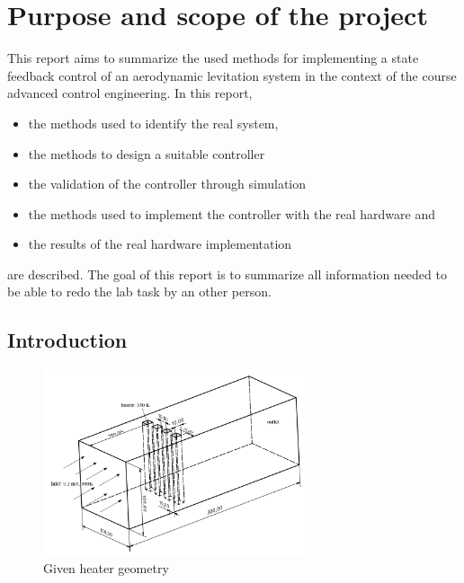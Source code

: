 \chapter{Purpose and scope of the project}
\label{chapter:purpose_and_scope}
This report aims to summarize the used methods for implementing a state feedback control of an aerodynamic levitation system in the context of the course advanced control engineering. In this report, 
\begin{itemize}
    \item the methods used to identify the real system,
    \item the methods to design a suitable controller
    \item the validation of the controller through simulation 
    \item the methods used to implement the controller with the real hardware and
    \item the results of the real hardware implementation
\end{itemize}
    are described. The goal of this report is to summarize all information needed to be able to redo the lab task by an other person. 

\section{Introduction}



    \begin{figure}[h]   
    \centering
    \includegraphics[width=0.7\textwidth]{img/heater_geo_og.png}
    \caption{Given heater geometry}
    \label{fig:heater_geo}
\end{figure}
